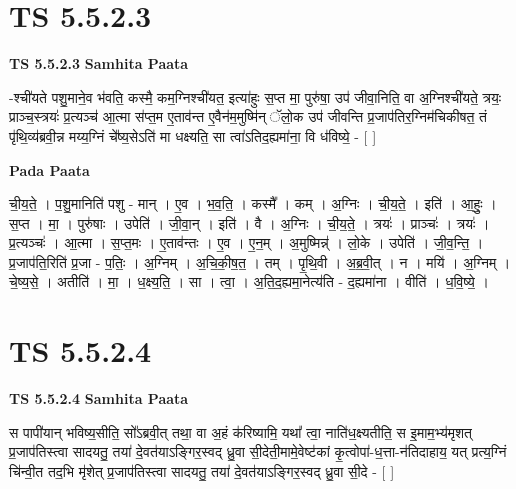 \documentclass[17pt]{extarticle}
\begin{document}
\section*{ TS 5.5.2.3 }

\textbf{TS 5.5.2.3 } \newline
\textbf{Samhita Paata} \newline

-श्ची॑यते पशु॒माने॒व भ॑वति॒ कस्मै॒ कम॒ग्निश्ची॑यत॒ इत्या॑हुः स॒प्त मा॒ पुरु॑षा॒ उप॑ जीवा॒निति॒ वा अ॒ग्निश्ची॑यते॒ त्रयः॒ प्राञ्च॒स्त्रयः॑ प्र॒त्यञ्च॑ आ॒त्मा स॑प्त॒म ए॒ताव॑न्त ए॒वैन॑म॒मुष्मि॑न् ॅलो॒क उप॑ जीवन्ति प्र॒जाप॑तिर॒ग्निम॑चिकीषत॒ तं पृ॑थि॒व्य॑ब्रवी॒न्न मय्य॒ग्निं चे᳚ष्य॒सेऽति॑ मा धक्ष्यति॒ सा त्वा॑ऽतिद॒ह्यमा॑ना॒ वि ध॑विष्ये॒ - [  ] \newline

\textbf{Pada Paata} \newline

ची॒य॒ते॒ । प॒शु॒मानिति॑ पशु - मान् । ए॒व । भ॒व॒ति॒ । कस्मै᳚ । कम् । अ॒ग्निः । ची॒य॒ते॒ । इति॑ । आ॒हुः॒ । स॒प्त । मा॒ । पुरु॑षाः । उपेति॑ । जी॒वा॒न् । इति॑ । वै । अ॒ग्निः । ची॒य॒ते॒ । त्रयः॑ । प्राञ्चः॑ । त्रयः॑ । प्र॒त्यञ्चः॑ । आ॒त्मा । स॒प्त॒मः । ए॒ताव॑न्तः । ए॒व । ए॒न॒म् । अ॒मुष्मिन्न्॑ । लो॒के । उपेति॑ । जी॒व॒न्ति॒ । प्र॒जाप॑ति॒रिति॑ प्र॒जा - प॒तिः॒ । अ॒ग्निम् । अ॒चि॒की॒ष॒त॒ । तम् । पृ॒थि॒वी । अ॒ब्र॒वी॒त् । न । मयि॑ । अ॒ग्निम् । चे॒ष्य॒से॒ । अतीति॑ । मा॒ । ध॒क्ष्य॒ति॒ । सा । त्वा॒ । अ॒ति॒द॒ह्यमा॒नेत्य॑ति - द॒ह्यमा॑ना । वीति॑ । ध॒वि॒ष्ये॒ ।  \newline




\section*{ TS 5.5.2.4 }

\textbf{TS 5.5.2.4 } \newline
\textbf{Samhita Paata} \newline

स पापी॑यान् भविष्य॒सीति॒ सो᳚ऽब्रवी॒त् तथा॒ वा अ॒हं क॑रिष्यामि॒ यथा᳚ त्वा॒ नाति॑ध॒क्ष्यतीति॒ स इ॒माम॒भ्य॑मृशत् प्र॒जाप॑तिस्त्वा सादयतु॒ तया॑ दे॒वत॑याऽङ्गिर॒स्वद् ध्रु॒वा सी॒देती॒मामे॒वेष्ट॑कां कृ॒त्वोपा॑-ध॒त्ता-न॑तिदाहाय॒ यत् प्रत्य॒ग्निं चि॑न्वी॒त तद॒भि मृ॑शेत् प्र॒जाप॑तिस्त्वा सादयतु॒ तया॑ दे॒वत॑याऽङ्गिर॒स्वद् ध्रु॒वा सी॒दे - [  ] \newline
\end{document}
